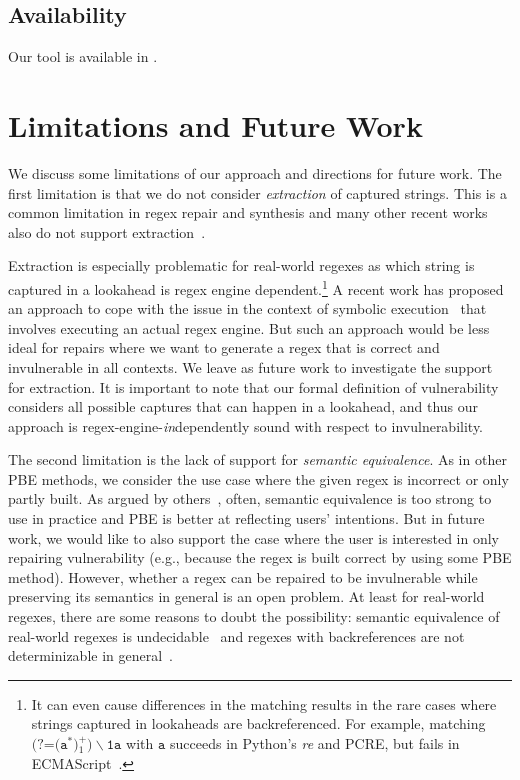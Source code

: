 \documentclass[conference]{IEEEtran}
\begin{document}
\subsection{Availability}
Our tool is available in \cite{remedy}.






\section{Limitations and Future Work}
\label{sec:limit}


We discuss some limitations of our approach and directions for future work.
The first limitation is that we do not consider {\em extraction} of captured strings.  This is a common limitation in regex repair and synthesis and many other recent works also do not support extraction~\cite{10.1145/3360565,10.1145/3093335.2993244,DBLP:journals/corr/abs-1908-03316,FlashRegex}.  

Extraction is especially problematic for real-world regexes as which string is captured in a lookahead is regex engine dependent.\footnote{It can even cause differences in the matching results in the rare cases where strings captured in lookaheads are backreferenced.  For example, matching $\texttt{(?=(a$^*$)$_1^+$)$\backslash$1a}$ with $\texttt{a}$ succeeds in Python's {\em re} and PCRE, but
fails in ECMAScript~\cite{10.1145/3338906.3338909}.}  A recent work has proposed an approach to cope with the issue in the context of symbolic execution~\cite{10.1145/3314221.3314645} that involves executing an actual regex engine.  But such an approach would be less ideal for repairs where we want to generate a regex that is correct and invulnerable in all contexts.  We leave as future work to investigate the support for extraction.  
It is important to note that our formal definition of vulnerability considers all possible captures that can happen in a lookahead, and thus our approach is regex-engine-{\em in}dependently sound with respect to invulnerability.

The second limitation is the lack of support for {\em semantic equivalence}.  As in other PBE methods, we consider the use case where the given regex is incorrect or only partly built.  As argued by others~\cite{FlashRegex,Davis:2018:IRE:3236024.3236027,Shen:2018:RCR:3238147.3238159}, often, semantic equivalence is too strong to use in practice and PBE is better at reflecting users' intentions.  But in future work, we would like to also support the case where the user is interested in only repairing vulnerability (e.g., because the regex is built correct by using some PBE method).  However, whether a regex can be repaired to be invulnerable while preserving its semantics in general is an open problem.  At least for real-world regexes, there are some reasons to doubt the possibility: semantic equivalence of real-world regexes is undecidable~\cite{backreferenceisundeci} and regexes with backreferences are not determinizable in general~\cite{SCHMID20161}.                            
\end{document}
